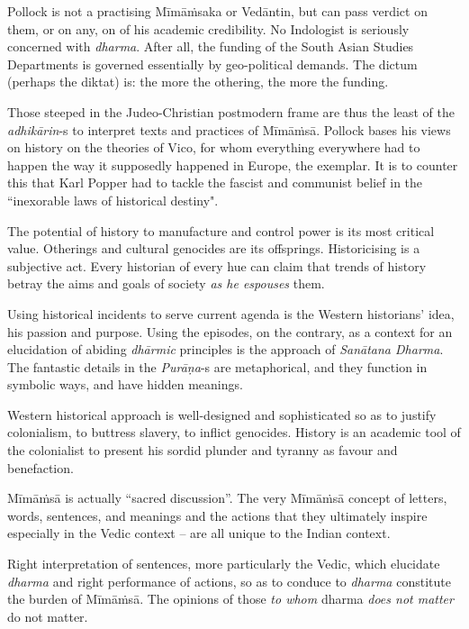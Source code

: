 Pollock is not a practising Mīmāṁsaka or Vedāntin, but can pass verdict on them, or on any, on of his academic credibility. No Indologist is seriously concerned with \textit{dharma}. After all, the funding of the South Asian Studies Departments is governed essentially by geo-political demands. The dictum (perhaps the diktat) is: the more the othering, the more the funding.

 Those steeped in the Judeo-Christian postmodern frame are thus the least of the \textit{adhikārin}-s to interpret texts and practices of Mīmāṁsā. Pollock bases his views on history on the theories of Vico, for whom everything everywhere had to happen the way it supposedly happened in Europe, the exemplar. It is to counter this that Karl Popper had to tackle the fascist and communist belief in the ``inexorable laws of historical destiny".

 The potential of history to manufacture and control power is its most critical value. Otherings and cultural genocides are its offsprings. Historicising is a subjective act. Every historian of every hue can claim that trends of history betray the aims and goals of society \textit{as he espouses} them.

Using historical incidents to serve current agenda is the Western historians’ idea, his passion and purpose. Using the episodes, on the contrary, as a context for an elucidation of abiding \textit{dhārmic} principles is the approach of \textit{Sanātana Dharma}. The fantastic details in the \hbox{\textit{Purāṇa}-s} are metaphorical, and they function in symbolic ways, and have hidden meanings.

Western historical approach is well-designed and sophisticated so as to justify colonialism, to buttress slavery, to inflict genocides. History is an academic tool of the colonialist to present his sordid plunder and tyranny as favour and benefaction.

Mīmāṁsā is actually “sacred discussion”. The very Mīmāṁsā concept of letters, words, sentences, and meanings and the actions that they ultimately inspire especially in the Vedic context – are all unique to the Indian context.

Right interpretation of sentences, more particularly the Vedic, which elucidate \textit{dharma} and right performance of actions, so as to conduce to \textit{dharma} constitute the burden of Mīmāṁsā. The opinions of those \textit{to whom} dharma \textit{does not matter} do not matter.

